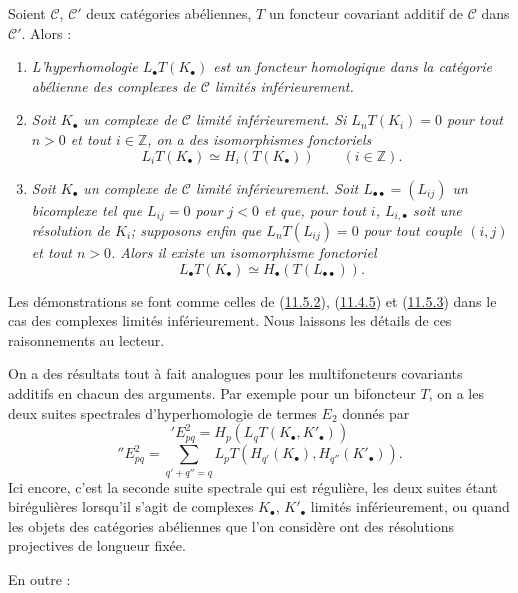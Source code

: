\begin{proposition}[11.6.3]
\label{0.11.6.3-fr}
Soient $\mathcal C$, $\mathcal C'$ deux catégories abéliennes, $T$ un foncteur
covariant additif de $\mathcal C$ dans $\mathcal C'$. Alors :
\begin{enumerate}
\item[{\rm(i)}] \emph{L'hyperhomologie $L_\bullet T(K_\bullet)$ est un
foncteur homologique dans la catégorie abélienne des complexes de
$\mathcal C$ limités inférieurement.}
\item[{\rm(ii)}] \emph{Soit $K_\bullet$ un complexe de $\mathcal C$ limité
inférieurement. Si $L_nT(K_i)=0$ pour tout $n>0$ et tout $i\in\mathbb Z$, on
a des isomorphismes fonctoriels}
\[
\label{0.11.6.3.1-fr}
\tag{11.6.3.1}
L_iT(K_\bullet)\simeq H_i(T(K_\bullet))\qquad(i\in\mathbb Z).
\]
\item[{\rm(iii)}] \emph{Soit $K_\bullet$ un complexe de $\mathcal C$ limité
inférieurement. Soit $L_{\bullet\bullet}=(L_{ij})$ un bicomplexe tel que
$L_{ij}=0$ pour $j<0$ et que, pour tout $i$, $L_{i,\bullet}$ soit une
résolution de $K_i$; supposons enfin que $L_nT(L_{ij})=0$ pour tout couple
$(i,j)$ et tout $n>0$. Alors il existe un isomorphisme fonctoriel}
\[
\label{0.11.6.3.2-fr}
\tag{11.6.3.2}
L_\bullet T(K_\bullet)\simeq H_\bullet(T(L_{\bullet\bullet})).
\]
\end{enumerate}
Les démonstrations se font comme celles de
(\hyperref[0.11.5.2-fr]{11.5.2}), (\hyperref[0.11.4.5-fr]{11.4.5}) et
(\hyperref[0.11.5.3-fr]{11.5.3}) dans le cas des complexes limités
inférieurement. Nous laissons les détails de ces raisonnements au lecteur.
\end{proposition}

\begin{env}[11.6.4]
\label{0.11.6.4-fr}
On a des résultats tout à fait analogues pour les multifoncteurs covariants
additifs en chacun des arguments. Par exemple pour un bifoncteur $T$, on a
les deux suites spectrales d'hyperhomologie de termes $E_2$ donnés par
\[
\label{0.11.6.4.1-fr}
\tag{11.6.4.1}
{}'E^2_{pq}=H_p(L_qT(K_\bullet,K'_\bullet))
\]
\[
\label{0.11.6.4.2-fr}
\tag{11.6.4.2}
{}''E^2_{pq}=
\sum_{q'+q''=q}L_pT(H_{q'}(K_\bullet),H_{q''}(K'_\bullet)).
\]
Ici encore, c'est la seconde suite spectrale qui est régulière, les deux
suites étant birégulières lorsqu'il s'agit de complexes $K_\bullet$,
$K'_\bullet$ limités inférieurement, ou quand les objets des catégories
abéliennes que l'on considère ont des résolutions projectives de longueur
fixée.

En outre :
\end{env}

